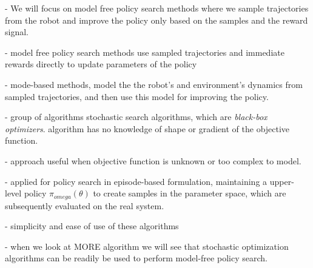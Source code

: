 - We will focus on model free policy search methods where we sample trajectories from
the robot and improve the policy only based on the samples and the reward signal.

- model free policy search methods use sampled trajectories and immediate rewards directly
to update parameters of the policy

- mode-based methods, model the the robot's and environment's dynamics from sampled
  trajectories, and then use this model for improving the policy.

- group of algorithms stochastic search algorithms, which are \textit{black-box optimizers}.
algorithm has no knowledge of shape or gradient of the objective function.

- approach useful when objective function is unknown or too complex to model.

- applied for policy search in episode-based formulation, maintaining a upper-level policy
$\pi_{omega}(\theta)$ to create samples in the parameter space, which are
subsequently evaluated on the real system.

- simplicity and ease of use of these algorithms

- when we look at MORE algorithm we will see that stochastic optimization algorithms can
be readily be used to perform model-free policy search.
  
%
%
%
%
%
%

